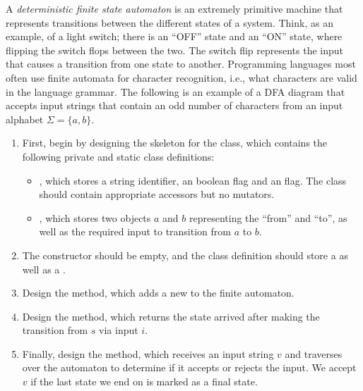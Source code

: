 A \emph{deterministic finite state automaton} is an extremely primitive machine that represents transitions between the different states of a system. Think, as an example, of a light switch; there is an ``OFF'' state and an ``ON'' state, where flipping the switch flops between the two. The switch flip represents the input that causes a transition from one state to another. Programming languages most often use finite automata for character recognition, i.e., what characters are valid in the language grammar. The following is an example of a DFA diagram that accepts input strings that contain an odd number of  characters from an input alphabet $\Sigma = \{a, b\}$.

\begin{enumerate}[label=(\alph*)]
    \item First, begin by designing the skeleton for the  class, which contains the following private and static class definitions:
    \begin{itemize}
        \item {}, which stores a string identifier, an  boolean flag and an  flag. The class should contain appropriate accessors but no mutators.
        \item {}, which stores two  objects $a$ and $b$ representing the ``from'' and ``to'', as well as the required input to transition from $a$ to $b$. 
    \end{itemize}
    \item The  constructor should be empty, and the class definition should store a  as well as a . 
    \item Design the  method, which adds a new  to the finite automaton.
    \item Design the  method, which returns the state arrived after making the transition from $s$ via input $i$.
    \item Finally, design the  method, which receives an input string $v$ and traverses over the automaton to determine if it accepts or rejects the input. We accept $v$ if the last state we end on is marked as a final state.
\end{enumerate}


